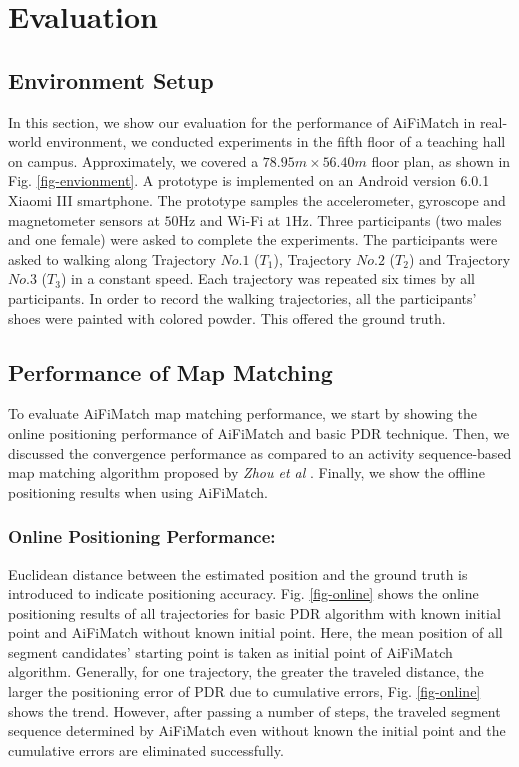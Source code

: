 \documentclass{llncs}
\begin{document}
\section{Evaluation}

\subsection{Environment Setup}

In this section, we show our evaluation for the performance of AiFiMatch in real-world environment, we conducted experiments in the fifth floor of a teaching hall on campus. Approximately, we covered a $78.95m \times 56.40m$ floor plan, as shown in Fig. \ref{fig-envionment}. A prototype is implemented on an Android version 6.0.1 Xiaomi III smartphone. The prototype samples the accelerometer, gyroscope and magnetometer sensors at $50$Hz and Wi-Fi at $1$Hz. Three participants (two males and one female) were asked to complete the experiments. The participants were asked to walking along Trajectory $No.1$ ($T_1$), Trajectory $No.2$ ($T_2$) and Trajectory $No.3$ ($T_3$) in a constant speed. Each trajectory was repeated six times by all participants. In order to record the walking trajectories, all the participants' shoes were painted with colored powder. This offered the ground truth.

\subsection{Performance of Map Matching}

To evaluate AiFiMatch map matching performance, we start by showing the online positioning performance of AiFiMatch and basic PDR technique. Then, we discussed the convergence performance as compared to an activity sequence-based map matching algorithm proposed by \emph{Zhou et al} \cite{zhou2015activity}. Finally, we show the offline positioning results when using AiFiMatch.

\subsubsection{Online Positioning Performance:}

Euclidean distance between the estimated position and the ground truth is introduced to indicate positioning accuracy.  Fig. \ref{fig-online} shows the online positioning results of all trajectories for basic PDR algorithm with known initial point and AiFiMatch without known initial point.  Here, the mean position of all segment candidates' starting point is taken as initial point of AiFiMatch algorithm. Generally, for one trajectory, the greater the traveled distance, the larger the positioning error of PDR due to cumulative errors, Fig. \ref{fig-online} shows the trend.  However, after passing a number of steps, the traveled segment sequence determined by AiFiMatch even without known the initial point and the cumulative  errors are eliminated successfully.
\end{document}
